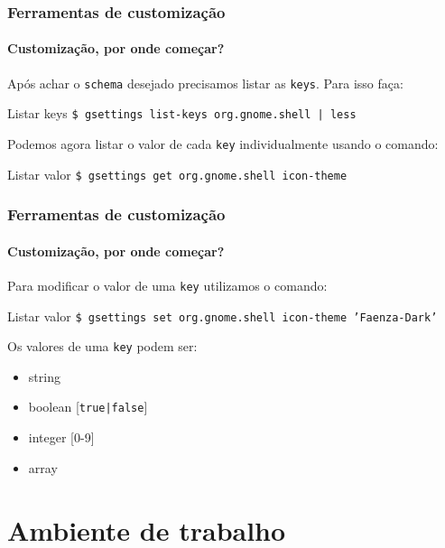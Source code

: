 \begin{frame}\frametitle{Ferramentas de customização}\framesubtitle{Customização, por onde começar?}

Após achar o \texttt{schema} desejado precisamos listar as \texttt{keys}. Para isso faça:

\begin{block}{Listar keys}
\texttt{\$ gsettings list-keys org.gnome.shell | less}
\end{block}

\medskip

Podemos agora listar o valor de cada \texttt{key} individualmente usando o comando:

\begin{block}{Listar valor}
\texttt{\$ gsettings get org.gnome.shell icon-theme}
\end{block}

\end{frame}

\begin{frame}\frametitle{Ferramentas de customização}\framesubtitle{Customização, por onde começar?}

Para modificar o valor de uma \texttt{key} utilizamos o comando:

\begin{block}{Listar valor}
\texttt{\$ gsettings set org.gnome.shell icon-theme 'Faenza-Dark'}
\end{block}

\medskip

Os valores de uma \texttt{key} podem ser:
\begin{itemize}
	\item string
	\item boolean [\texttt{true|false}]
	\item integer [0-9]
	\item array
\end{itemize}

\end{frame}

\section{Ambiente de trabalho}

\begin{frame}


\end{frame}


